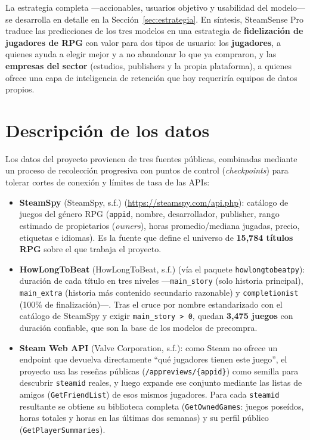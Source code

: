 \documentclass[11pt,letterpaper]{article}
\newcommand{\code}[1]{\texttt{\small #1}}
\begin{document}
La estrategia completa ---accionables, usuarios objetivo y usabilidad del modelo--- se desarrolla en detalle en la Sección~\ref{sec:estrategia}. En síntesis, SteamSense Pro traduce las predicciones de los tres modelos en una estrategia de \textbf{fidelización de jugadores de RPG} con valor para dos tipos de usuario: los \textbf{jugadores}, a quienes ayuda a elegir mejor y a no abandonar lo que ya compraron, y las \textbf{empresas del sector} (estudios, publishers y la propia plataforma), a quienes ofrece una capa de inteligencia de retención que hoy requeriría equipos de datos propios.

\section{Descripción de los datos}

Los datos del proyecto provienen de tres fuentes públicas, combinadas mediante un proceso de recolección progresiva con puntos de control (\textit{checkpoints}) para tolerar cortes de conexión y límites de tasa de las APIs:

\begin{itemize}
  \item \textbf{SteamSpy} (SteamSpy, s.f.) (\url{https://steamspy.com/api.php}): catálogo de juegos del género RPG (\code{appid}, nombre, desarrollador, publisher, rango estimado de propietarios (\emph{owners}), horas promedio/mediana jugadas, precio, etiquetas e idiomas). Es la fuente que define el universo de \textbf{15{,}784 títulos RPG} sobre el que trabaja el proyecto.
  \item \textbf{HowLongToBeat} (HowLongToBeat, s.f.) (vía el paquete \code{howlongtobeatpy}): duración de cada título en tres niveles ---\code{main\_story} (solo historia principal), \code{main\_extra} (historia más contenido secundario razonable) y \code{completionist} (100\% de finalización)---. Tras el cruce por nombre estandarizado con el catálogo de SteamSpy y exigir \code{main\_story > 0}, quedan \textbf{3{,}475 juegos} con duración confiable, que son la base de los modelos de precompra.
  \item \textbf{Steam Web API} (Valve Corporation, s.f.): como Steam no ofrece un endpoint que devuelva directamente ``qué jugadores tienen este juego'', el proyecto usa las reseñas públicas (\code{/appreviews/\{appid\}}) como semilla para descubrir \code{steamid} reales, y luego expande ese conjunto mediante las listas de amigos (\code{GetFriendList}) de esos mismos jugadores. Para cada \code{steamid} resultante se obtiene su biblioteca completa (\code{GetOwnedGames}: juegos poseídos, horas totales y horas en las últimas dos semanas) y su perfil público (\code{GetPlayerSummaries}).
\end{itemize}
\end{document}
